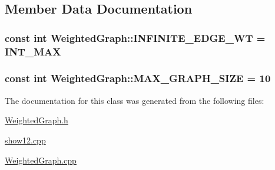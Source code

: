\subsection{Member Data Documentation}
\subsubsection[{\texorpdfstring{I\+N\+F\+I\+N\+I\+T\+E\+\_\+\+E\+D\+G\+E\+\_\+\+WT}{INFINITE_EDGE_WT}}]{\setlength{\rightskip}{0pt plus 5cm}const int Weighted\+Graph\+::\+I\+N\+F\+I\+N\+I\+T\+E\+\_\+\+E\+D\+G\+E\+\_\+\+WT = I\+N\+T\+\_\+\+M\+AX\hspace{0.3cm}{\ttfamily [static]}}\hypertarget{class_weighted_graph_ab41b338adfc1ebc080cfca0e0b85de4b}{}\label{class_weighted_graph_ab41b338adfc1ebc080cfca0e0b85de4b}
\subsubsection[{\texorpdfstring{M\+A\+X\+\_\+\+G\+R\+A\+P\+H\+\_\+\+S\+I\+ZE}{MAX_GRAPH_SIZE}}]{\setlength{\rightskip}{0pt plus 5cm}const int Weighted\+Graph\+::\+M\+A\+X\+\_\+\+G\+R\+A\+P\+H\+\_\+\+S\+I\+ZE = 10\hspace{0.3cm}{\ttfamily [static]}}\hypertarget{class_weighted_graph_af9b34017e5b494cd3aca2dbc8335fc3c}{}\label{class_weighted_graph_af9b34017e5b494cd3aca2dbc8335fc3c}


The documentation for this class was generated from the following files\+:\begin{DoxyCompactItemize}
\item 
\hyperlink{_weighted_graph_8h}{Weighted\+Graph.\+h}\item 
\hyperlink{show12_8cpp}{show12.\+cpp}\item 
\hyperlink{_weighted_graph_8cpp}{Weighted\+Graph.\+cpp}\end{DoxyCompactItemize}
